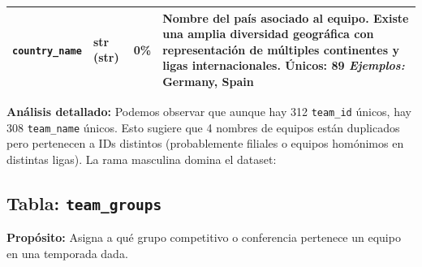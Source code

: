 \documentclass[12pt,a4paper]{article}
\begin{document}
\begin{center}
\begin{longtable}{T{3.5cm} C{2.5cm} C{1.5cm} p{7.0cm}}
\texttt{country\_name} & str \newline (str) & 0\% & Nombre del país asociado al equipo. Existe una amplia diversidad geográfica con representación de múltiples continentes y ligas internacionales. \newline \textbf{Únicos:} 89 \newline \textit{Ejemplos:} Germany, Spain \\

\bottomrule
\end{longtable}
\end{center}

\textbf{Análisis detallado:}
Podemos observar que aunque hay 312 \texttt{team\_id} únicos, hay 308 \texttt{team\_name} únicos. Esto sugiere que 4 nombres de equipos están duplicados pero pertenecen a IDs distintos (probablemente filiales o equipos homónimos en distintas ligas). La rama masculina domina el dataset:
\subsection{Tabla: \texttt{team\_groups}}

\textbf{Propósito:} Asigna a qué grupo competitivo o conferencia pertenece un equipo en una temporada dada.
\end{document}
